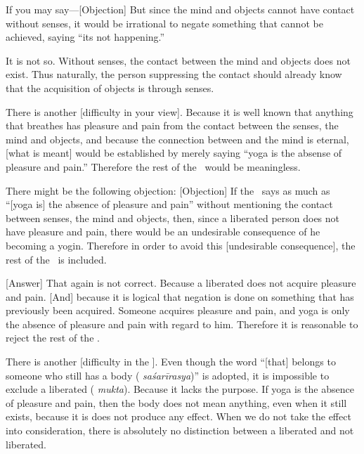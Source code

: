 If%
 you may say---[Objection] But since the mind and objects
cannot have contact without senses, it would be irrational to negate
something that cannot be achieved, saying ``its not happening.''

It is not so.  Without senses, the contact between the mind and objects
does not exist.  Thus naturally, the person suppressing the contact should already know that the acquisition of objects is through senses.

There%
 is another [difficulty in your view].  Because it is well
known that anything that breathes has pleasure and pain from the
contact between the senses, the mind and objects, and because the connection between \atman\/ and the mind is eternal, [what is meant] would be established by
merely saying ``yoga is the absense of pleasure and pain.''  Therefore the
rest of the \sutra\ would be meaningless.

There%
 might be the following objection: [Objection] If the \sutra\ says as much as ``[yoga is] the absence of pleasure and pain'' without
mentioning the contact between senses, the mind and objects, then,
since a liberated person does not have pleasure and pain, there would be an undesirable consequence of he becoming a yogin.  Therefore in order to avoid this [undesirable consequence], the rest of the \sutra\ is included.

[Answer]%
 That again is not correct.  Because a liberated 
does not acquire pleasure and pain.  [And] because it is logical that
negation is done on something that has previously been acquired.  Someone
acquires pleasure and pain, and yoga is only the absence of pleasure
and pain with regard to him.  Therefore it is reasonable to
reject the rest of the \sutra.

There%
 is another [difficulty in the \sutra].  Even though the
word ``[that] belongs to someone who still has a body (\emph{%
  saśarīrasya})'' is adopted, it is impossible to exclude a liberated (\emph{%
  mukta}).  Because it lacks the purpose.  If yoga is the absence of
pleasure and pain, then the body does not mean anything, even when
it still exists, because it is does not produce any effect.  When we do not take the effect into consideration, there is absolutely no distinction between a liberated and not liberated.

